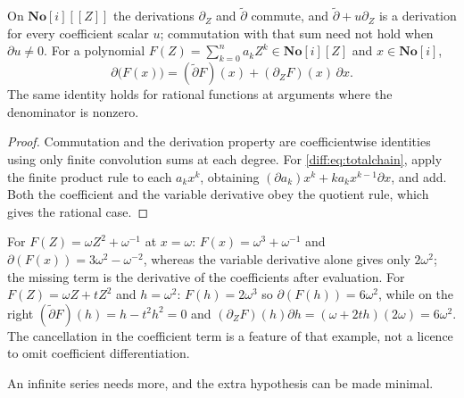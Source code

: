 \documentclass[11pt,letterpaper]{article}
\numberwithin{equation}{section}
\theoremstyle{definition}
\theoremstyle{remark}
\newcommand{\SC}{\mathbf{No}[i]}
\newcommand{\der}{\partial}
\newcommand{\dertil}{\widetilde{\der}}
\newcommand{\derZ}{\der_{Z}}
\begin{document}
\begin{proposition}
\label{diff:prop:totalchain}
On $\SC[[Z]]$ the derivations $\derZ$ and $\dertil$ commute, and
$\dertil+u\derZ$ is a derivation for every coefficient scalar $u$; commutation
with that sum need not hold when $\der u\neq0$. For a polynomial
$F(Z)=\sum_{k=0}^{n}a_{k}Z^{k}\in\SC[Z]$ and $x\in\SC$,
\begin{equation}\label{diff:eq:totalchain}
 \der\bigl(F(x)\bigr)=(\dertil F)(x)+(\derZ F)(x)\,\der x .
\end{equation}
The same identity holds for rational functions at arguments where the
denominator is nonzero.
\end{proposition}
\begin{proof}
Commutation and the derivation property are coefficientwise identities using
only finite convolution sums at each degree. For \cref{diff:eq:totalchain},
apply the finite product rule to each $a_{k}x^{k}$, obtaining
$(\der a_{k})x^{k}+ka_{k}x^{k-1}\der x$, and add. Both the coefficient and the
variable derivative obey the quotient rule, which gives the rational case.
\end{proof}

\begin{example}
\label{diff:ex:totalchainchecks}
For $F(Z)=\omega Z^{2}+\omega^{-1}$ at $x=\omega$: $F(x)=\omega^{3}+\omega^{-1}$
and $\der(F(x))=3\omega^{2}-\omega^{-2}$, whereas the variable derivative
alone gives only $2\omega^{2}$; the missing term is the derivative of the
coefficients after evaluation. For $F(Z)=\omega Z+tZ^{2}$ and $h=\omega^{2}$:
$F(h)=2\omega^{3}$ so $\der(F(h))=6\omega^{2}$, while on the right
$(\dertil F)(h)=h-t^{2}h^{2}=0$ and
$(\derZ F)(h)\der h=(\omega+2th)(2\omega)=6\omega^{2}$. The cancellation in
the coefficient term is a feature of that example, not a licence to omit
coefficient differentiation.
\end{example}

An infinite series needs more, and the extra hypothesis can be made minimal.
\end{document}
